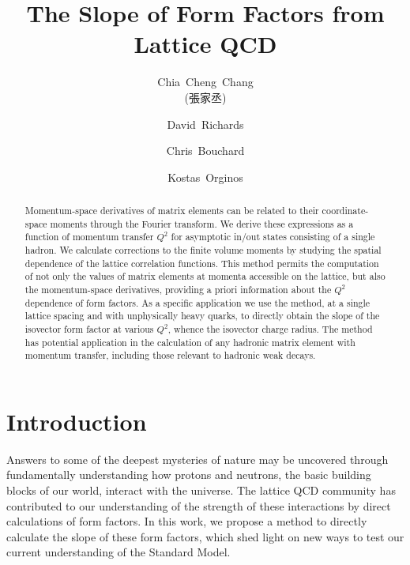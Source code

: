 \documentclass[prd,aps,twocolumn,superscriptaddress,tightenlines,nofootinbib,floatfix,preprintnumbers,10pt]{revtex4-1}
\newcommand{\mydate}{\ \today \ - \number\hour :\number\minute}
\begin{document}
\title{The Slope of Form Factors from Lattice QCD}

\author{Chia~Cheng~Chang \begin{CJK*}{UTF8}{bsmi}(張家丞)\end{CJK*}}
\affiliation{\ithems}
\affiliation{\lblnsd}
\affiliation{\ucb}


\author{David~Richards}
\affiliation{\jlab}

\author{Chris~Bouchard}
\affiliation{\glasgow}

\author{Kostas~Orginos}
\affiliation{\wm}
\affiliation{\jlab}




\begin{abstract}
Momentum-space derivatives of matrix elements can be related to their coordinate-space moments through the Fourier transform. We derive these expressions as a function of momentum transfer $Q^2$ for asymptotic in/out states consisting of a single hadron. We calculate corrections to the finite volume moments by studying the spatial dependence of the lattice correlation functions. This method permits the computation of not only the values of matrix elements at momenta accessible on the lattice, but also the momentum-space derivatives, providing a priori information about the $Q^2$ dependence of form factors. As a specific application we use the method, at a single lattice spacing and with unphysically heavy quarks, to directly obtain the slope of the isovector form factor at various $Q^2$, whence the isovector charge radius. The method has potential application in the calculation of any hadronic matrix element with momentum transfer, including those relevant to hadronic weak decays.
\end{abstract}
\maketitle



\section{Introduction\label{sec:intro}}
Answers to some of the deepest mysteries of nature may be uncovered
through fundamentally understanding how protons and neutrons, the
basic building blocks of our world, interact with the universe. The
lattice QCD community has contributed to our understanding of the
strength of these interactions by direct calculations of form
factors. In this work, we propose a method to directly calculate the
slope of these form factors, which shed light on new ways to test our
current understanding of the Standard Model.
\end{document}

